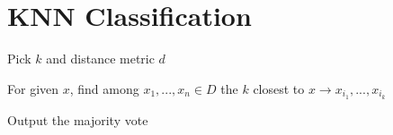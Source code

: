 \section*{KNN Classification}

\begin{rowlist}
	\item Pick $k$ and distance metric $d$
	\item For given $x$, find among $x_1,...,x_n \in D$ the $k$ closest to $x \to x_{i_1},..., x_{i_k}$
	\item Output the majority vote
\end{rowlist}
